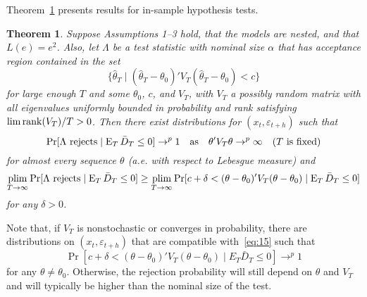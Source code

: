 \documentclass[11pt]{article}
\newcommand{\e}{\varepsilon}
\newtheorem{thm}{Theorem}
\begin{document}
Theorem~\ref{res:ftest} presents results for in-sample hypothesis
tests.
\begin{thm}\label{res:ftest}
  Suppose Assumptions 1--3 hold, that the models are nested, and that
  $L(e) = e^2$.  Also, let $\Lambda$ be a test statistic with nominal
  size $\alpha$ that has acceptance region contained in the set
  \[\{\hat{\theta}_T \mid (\hat{\theta}_T -
  \theta_0)'V_T(\hat{\theta}_T - \theta_0) < c \}\] for large enough
  $T$ and some $\theta_0$, $c$, and $V_T$, with $V_T$ a possibly
  random matrix with all eigenvalues uniformly bounded in probability
  and rank satisfying $\lim \operatorname*{rank}(V_T)/T > 0$.  Then there exist
  distributions for $(x_t, \e_{t+h})$ such that
  \begin{equation}
    \label{eq:11}
    \Pr[\Lambda \text{ rejects} \mid \operatorname{E}_T \bar{D}_{T} \leq 0] \to^p 1
    \quad \text{as} \quad
    \theta'V_T\theta \to^p \infty \quad \text{($T$ is fixed)}
  \end{equation}
  for almost every sequence $\theta$ (a.e. with respect to Lebesgue
  measure) and 
  \begin{equation}
    \label{eq:15}
    \operatorname*{plim}_{T \to \infty} \Pr[\Lambda \text{ rejects} \mid
    \operatorname{E}_T \bar{D}_{T} \leq 0] \geq \operatorname*{plim}_{T \to \infty} \Pr[c + \delta < (\theta - \theta_0)' V_{T}
    (\theta - \theta_0) \mid \operatorname{E}_T \bar{D}_T \leq 0]
  \end{equation}
  for any $\delta > 0$.
\end{thm}
Note that, if $V_T$ is nonstochastic or converges in probability,
there are distributions on $(x_t, \e_{t+h})$ that are
compatible with~\eqref{eq:15} such that
\[\Pr[c + \delta < (\theta - \theta_0)'V_T (\theta - \theta_0) \mid
E_T \bar{D}_T \leq 0] \to^p 1
\]
for any $\theta \neq \theta_0$.  Otherwise, the rejection probability
will still depend on $\theta$ and $V_T$ and will typically be higher
than the nominal size of the test.
\end{document}
